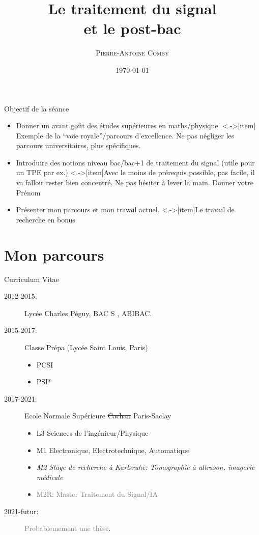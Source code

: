 \documentclass{beamer}
\title{Le traitement du signal \\et le post-bac}
\subtitle{}
\author[]{\textsc{Pierre-Antoine Comby}}
\institute{pierre-antoine.comby@ens-paris-saclay.fr}
\date{\today}
\begin{document}
\begin{frame}
   \titlepage
\end{frame}

\begin{frame}{Objectif de la séance}
  \begin{itemize}[<+->]
    \item Donner un avant goût des études supérieures en maths/physique.
    \note<.->[item]{ Exemple de la ``voie royale''/parcours d'excellence. Ne pas négliger les parcours universitaires, plus spécifiques.}
    \item Introduire des notions niveau bac/bac+1 de traitement du signal (utile pour un TPE par ex.)
    \note<.->[item]{Avec le moins de prérequis possible, pas facile, il va falloir rester bien concentré. Ne pas hésiter à lever la main. Donner votre Prénom}
    \item Présenter mon parcours et mon travail actuel.
    \note<.->[item]{Le travail de recherche en bonus}
  \end{itemize}
\end{frame}

\section{Mon parcours}
\label{sec:label}
\begin{frame}{Curriculum Vitae}
  \begin{description}
    \item[2012-2015:] Lycée Charles Péguy, BAC S , ABIBAC.
    \item[2015-2017:] Classe Prépa (Lycée Saint Louis, Paris)
      \begin{itemize}
        \item PCSI
        \item PSI*
      \end{itemize}
    \item[2017-2021:] Ecole Normale Supérieure \sout{Cachan} Paris-Saclay
      \begin{itemize}
        \item L3 Sciences de l'ingénieur/Physique
        \item M1 Electronique, Electrotechnique, Automatique
        \item \textit{M2 Stage de recherche à Karlsruhe: Tomographie à ultrason, imagerie médicale}
        \item \textcolor{gray}{M2R: Master Traitement du Signal/IA}
      \end{itemize}
    \item[2021-futur:] \textcolor{gray}{Probablemement une thèse}.
  \end{description}
\end{frame}
\end{document}
